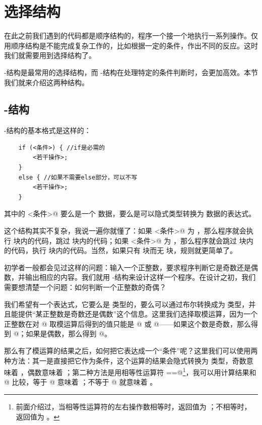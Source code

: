 \section{选择结构}
在此之前我们遇到的代码都是顺序结构的，程序一个接一个地执行一系列操作。仅用顺序结构是不能完成复杂工作的，比如根据一定的条件，作出不同的反应。这时我们就需要用到选择结构了。\par
\lstinline@if@-\lstinline@else@ 结构是最常用的选择结构，而 \lstinline@switch@-\lstinline@case@ 结构在处理特定的条件判断时，会更加高效。本节我们就来介绍这两种结构。\par
\subsection*{\lstinline@if@-\lstinline@else@ 结构}
\lstinline@if@-\lstinline@else@ 结构的基本格式是这样的：
\begin{lstlisting}
    if (<条件>) { //if是必需的
        <若干操作>;
    }
    else { //如果不需要else部分，可以不写
        <若干操作>;
    }
\end{lstlisting}
其中的 \lstinline@<条件>@ 要么是一个 \lstinline@bool@ 数据，要么是可以隐式类型转换为 \lstinline@bool@ 数据的表达式。\par
这个结构其实不复杂，我说一遍你就懂了：如果 \lstinline@<条件>@ 为 \lstinline@true@，那么程序就会执行 \lstinline@if@ 块内的代码，跳过 \lstinline@else@ 块内的代码；如果 \lstinline@<条件>@ 为 \lstinline@false@，那么程序就会跳过 \lstinline@if@ 块内的代码，执行 \lstinline@else@ 块内的代码。当然，如果只有 \lstinline@if@ 块而无 \lstinline@else@ 块，规则就更简单了。\par
初学者一般都会见过这样的问题：输入一个正整数，要求程序判断它是奇数还是偶数，并输出相应的内容。我们就用 \lstinline@if@-\lstinline@else@ 结构来设计这样一个程序。在设计之初，我们需要想清楚一个问题：如何判断一个正整数的奇偶？\par
我们希望有一个表达式，它要么是 \lstinline@bool@ 类型的，要么可以通过布尔转换成为 \lstinline@bool@ 类型，并且能提供``某正整数是奇数还是偶数''这个信息。这里我们选择取模运算，因为一个正整数在对 @ 取模运算后得到的值只能是 @ 或 @——如果这个数是奇数，那么得到 @；如果是偶数，那么得到 @。\par
那么有了模运算的结果之后，如何把它表达成一个``条件''呢？这里我们可以使用两种方法：其一是直接把它作为条件，这个运算的结果会隐式转换为 \lstinline@bool@ 类型，奇数意味着 \lstinline@true@，偶数意味着 \lstinline@false@；第二种方法是用相等性运算符 \lstinline@==@\footnote{前面介绍过，当相等性运算符的左右操作数相等时，返回值为 \lstinline@true@；不相等时，返回值为 \lstinline@false@。}，我可以用计算结果和 @ 比较，等于 @ 意味着 \lstinline@true@；不等于 @ 就意味着 \lstinline@false@。\par
